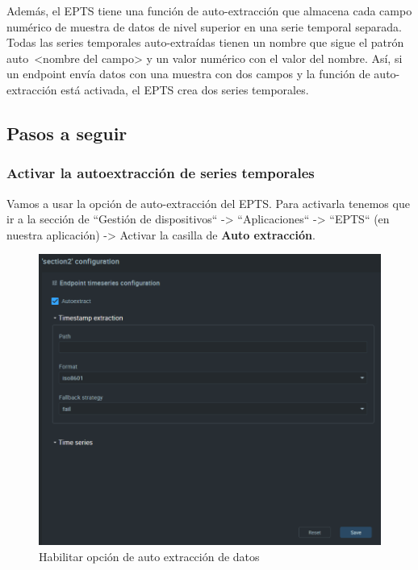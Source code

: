 {Además, el EPTS tiene una función de auto-extracción que almacena cada campo numérico de muestra de datos de nivel superior en una serie temporal separada. Todas las series temporales auto-extraídas tienen un nombre que sigue el patrón auto~<nombre del campo> y un valor numérico con el valor del nombre. Así, si un endpoint envía datos con una muestra con dos campos y la función de auto-extracción está activada, el EPTS crea dos series temporales. \\

\subsection{Pasos a seguir}

\subsubsection{Activar la autoextracción de series temporales}

Vamos a usar la opción de auto-extracción del EPTS. Para activarla tenemos que ir a la sección de ``Gestión de dispositivos`` -> ``Aplicaciones`` -> ``EPTS`` (en nuestra aplicación) -> Activar la casilla de \textbf{Auto extracción}. \\

\begin{figure}[hb!]
    \centering
    \includegraphics[width=\linewidth]{imagenes/autoextract-option.png}
    \caption{Habilitar opción de auto extracción de datos}
    \label{fig:figure10}
\end{figure}

}
